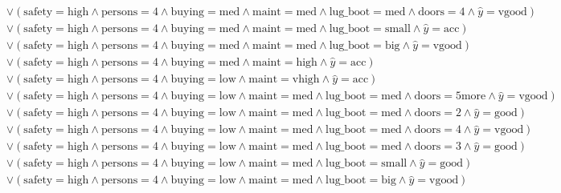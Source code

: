 \begin{scriptsize}
\[\begin{aligned}
  \\ & \lor (\text{safety}=\text{high} \land \text{persons}=\text{4} \land \text{buying}=\text{med} \land \text{maint}=\text{med} \land \text{lug_boot}=\text{med} \land \text{doors}=\text{4} \land \hat{y}=\text{vgood})
  \\ & \lor (\text{safety}=\text{high} \land \text{persons}=\text{4} \land \text{buying}=\text{med} \land \text{maint}=\text{med} \land \text{lug_boot}=\text{small} \land \hat{y}=\text{acc})
  \\ & \lor (\text{safety}=\text{high} \land \text{persons}=\text{4} \land \text{buying}=\text{med} \land \text{maint}=\text{med} \land \text{lug_boot}=\text{big} \land \hat{y}=\text{vgood})
  \\ & \lor (\text{safety}=\text{high} \land \text{persons}=\text{4} \land \text{buying}=\text{med} \land \text{maint}=\text{high} \land \hat{y}=\text{acc})
  \\ & \lor (\text{safety}=\text{high} \land \text{persons}=\text{4} \land \text{buying}=\text{low} \land \text{maint}=\text{vhigh} \land \hat{y}=\text{acc})
  \\ & \lor (\text{safety}=\text{high} \land \text{persons}=\text{4} \land \text{buying}=\text{low} \land \text{maint}=\text{med} \land \text{lug_boot}=\text{med} \land \text{doors}=\text{5more} \land \hat{y}=\text{vgood})
  \\ & \lor (\text{safety}=\text{high} \land \text{persons}=\text{4} \land \text{buying}=\text{low} \land \text{maint}=\text{med} \land \text{lug_boot}=\text{med} \land \text{doors}=\text{2} \land \hat{y}=\text{good})
  \\ & \lor (\text{safety}=\text{high} \land \text{persons}=\text{4} \land \text{buying}=\text{low} \land \text{maint}=\text{med} \land \text{lug_boot}=\text{med} \land \text{doors}=\text{4} \land \hat{y}=\text{vgood})
  \\ & \lor (\text{safety}=\text{high} \land \text{persons}=\text{4} \land \text{buying}=\text{low} \land \text{maint}=\text{med} \land \text{lug_boot}=\text{med} \land \text{doors}=\text{3} \land \hat{y}=\text{good})
  \\ & \lor (\text{safety}=\text{high} \land \text{persons}=\text{4} \land \text{buying}=\text{low} \land \text{maint}=\text{med} \land \text{lug_boot}=\text{small} \land \hat{y}=\text{good})
  \\ & \lor (\text{safety}=\text{high} \land \text{persons}=\text{4} \land \text{buying}=\text{low} \land \text{maint}=\text{med} \land \text{lug_boot}=\text{big} \land \hat{y}=\text{vgood})

\end{aligned}\]
\end{scriptsize}

